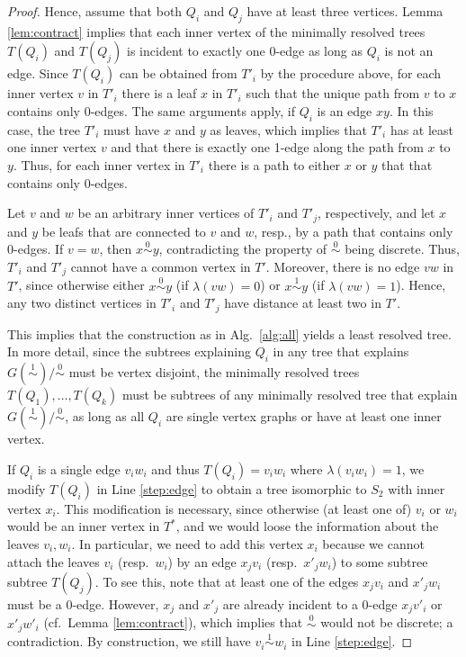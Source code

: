 \documentclass[smallextended]{svjour3}
\newcommand{\Ro}{\mathrel{\overset{0}{\sim}}}
\newcommand{\Rl}{\mathrel{\overset{1}{\sim}}}
\begin{document}
\begin{proof}
{  Hence, assume that both $Q_i$ and $Q_j$ have at least three vertices.
  Lemma \ref{lem:contract} implies that each inner vertex of the minimally
  resolved trees $T(Q_i)$ and $T(Q_j)$ is incident to exactly one 0-edge as
  long as $Q_i$ is not an edge.  Since $T(Q_i)$ can be obtained from $T'_i$
  by the procedure above, for each inner vertex $v$ in $T'_i$ there is a
  leaf $x$ in $T'_i$ such that the unique path from $v$ to $x$ contains
  only 0-edges.  The same arguments apply, if $Q_i$ is an edge $xy$. In
  this case, the tree $T'_i$ must have $x$ and $y$ as leaves, which implies
  that $T'_i$ has at least one inner vertex $v$ and that there is exactly
  one 1-edge along the path from $x$ to $y$. Thus, for each inner vertex in
  $T'_i$ there is a path to either $x$ or $y$ that that contains only
  0-edges.

  Let $v$ and $w$ be an arbitrary inner vertices of $T'_i$ and $T'_j$,
  respectively, and let $x$ and $y$ be leafs that are connected to $v$ and
  $w$, resp., by a path that contains only 0-edges. If $v=w$, then $x\Ro
  y$, contradicting the property of $\Ro$ being discrete.  Thus, $T'_i$ and
  $T'_j$ cannot have a common vertex in $T'$.  Moreover, there is no edge
  $vw$ in $T'$, since otherwise either $x\Ro y$ (if $\lambda(vw)=0$) or
  $x\Rl y$ (if $\lambda(vw)=1$).  Hence, any two distinct vertices in
  $T'_i$ and $T'_j$ have distance at least two in $T'$.

  This implies that the construction as in Alg.\ \ref{alg:all} yields a
  least resolved tree.  In more detail, since the subtrees explaining $Q_i$
  in any tree that explains $G(\Rl)/\Ro$ must be vertex disjoint, the
  minimally resolved trees $T(Q_1),\dots,T(Q_k)$ must be subtrees of any
  minimally resolved tree that explain $G(\Rl)/\Ro$, as long as all $Q_i$
  are single vertex graphs or have at least one inner vertex.

  If $Q_i$ is a single edge $v_iw_i$ and thus $T(Q_i) = v_iw_i$ where
  $\lambda(v_iw_i)=1$, we modify $T(Q_i)$ in Line \ref{step:edge} to obtain
  a tree isomorphic to $S_2$ with inner vertex $x_i$. This modification is
  necessary, since otherwise (at least one of) $v_i$ or $w_i$ would be an
  inner vertex in $T^*$, and we would loose the information about the
  leaves $v_i,w_i$. In particular, we need to add this vertex $x_i$ because
  we cannot attach the leaves $v_i$ (resp.\ $w_i$) by an edge $x_jv_i$
  (resp.\ $x'_jw_i$) to some subtree subtree $T(Q_j)$.  To see this, note
  that at least one of the edges $x_jv_i$ and $x'_jw_i$ must be a
  0-edge. However, $x_j$ and $x'_j$ are already incident to a 0-edge
  $x_jv'_i$ or $x'_jw'_i$ (cf.\ Lemma \ref{lem:contract}), which implies
  that $\Ro$ would not be discrete; a contradiction.  By construction, we
  still have $v_i\Rl w_i$ in Line \ref{step:edge}.
	
}
\end{proof}
\end{document}
